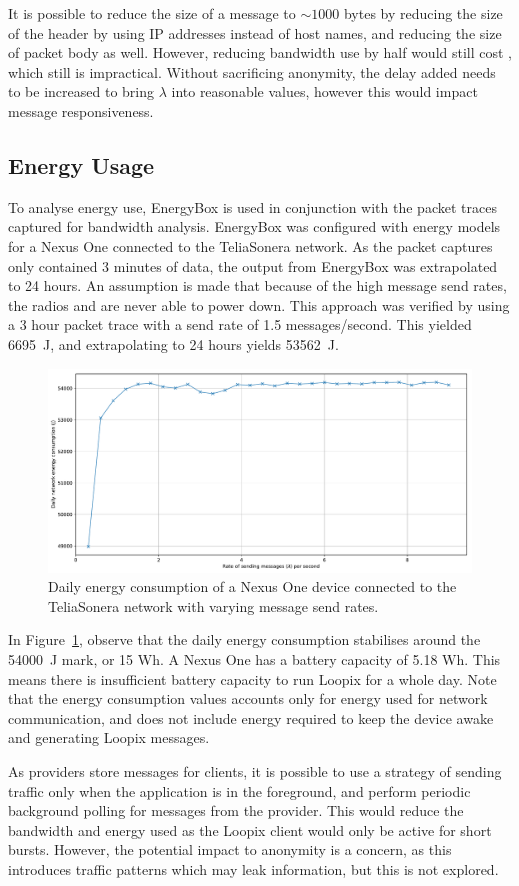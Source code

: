 \documentclass[final,dissertation.tex]{subfiles}
\begin{document}
It is possible to reduce the size of a message to $\sim1000$ bytes by reducing the size of the header by using IP addresses instead of host names, and reducing the size of packet body as well. However, reducing bandwidth use by half would still cost , which still is impractical. Without sacrificing anonymity, the delay added needs to be increased to bring $\lambda$ into reasonable values, however this would impact message responsiveness.

\subsection{Energy Usage}

To analyse energy use, EnergyBox \cite{vergara2014energybox} is used in conjunction with the packet traces captured for bandwidth analysis. EnergyBox was configured with energy models for a Nexus One connected to the TeliaSonera network. As the packet captures only contained 3 minutes of data, the output from EnergyBox was extrapolated to 24 hours. An assumption is made that because of the high message send rates, the radios and are never able to power down. This approach was verified by using a 3 hour packet trace with a send rate of 1.5 messages/second. This yielded \SI{6695}{\joule}, and extrapolating to 24 hours yields \SI{53562}{\joule}.

\begin{figure}[h]
	\includegraphics[width=\linewidth]{../figs/energy_use}
	\caption{Daily energy consumption of a Nexus One device connected to the TeliaSonera network with varying message send rates.}
	\label{fig:energy_use}
\end{figure}

In Figure~\ref{fig:energy_use}, observe that the daily energy consumption stabilises around the \SI{54000}{\joule} mark, or 15 Wh. A Nexus One has a battery capacity of 5.18 Wh. This means there is insufficient battery capacity to run Loopix for a whole day. Note that the energy consumption values accounts only for energy used for network communication, and does not include energy required to keep the device awake and generating Loopix messages.

As providers store messages for clients, it is possible to use a strategy of sending traffic only when the application is in the foreground, and perform periodic background polling for messages from the provider. This would reduce the bandwidth and energy used as the Loopix client would only be active for short bursts. However, the potential impact to anonymity is a concern, as this introduces traffic patterns which may leak information, but this is not explored.
\end{document}
